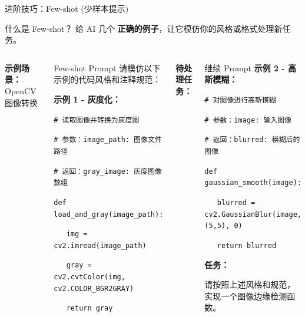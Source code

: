 \begin{frame}{进阶技巧：Few-shot (少样本提示)}
	\begin{block}{什么是 Few-shot？}
		给 AI 几个 \textbf{正确的例子}，让它模仿你的风格或格式处理新任务。
	\end{block}

	\vspace{0.3cm}

	\begin{columns}
		\textbf{示例场景：} OpenCV 图像转换

		\vspace{0.2cm}

		\begin{exampleblock}{Few-shot Prompt}
			请模仿以下示例的代码风格和注释规范：

			\vspace{0.2cm}

			\textbf{示例 1 - 灰度化：}

			\texttt{\# 读取图像并转换为灰度图}

			\texttt{\# 参数：image\_path: 图像文件路径}

			\texttt{\# 返回：gray\_image: 灰度图像数组}

			\texttt{def load\_and\_gray(image\_path):}

			\texttt{~~~img = cv2.imread(image\_path)}

			\texttt{~~~gray = cv2.cvtColor(img, cv2.COLOR\_BGR2GRAY)}

			\texttt{~~~return gray}
		\end{exampleblock}

		\textbf{待处理任务：}

		\vspace{0.2cm}

		\begin{exampleblock}{继续 Prompt}
			\textbf{示例 2 - 高斯模糊：}

			\texttt{\# 对图像进行高斯模糊}

			\texttt{\# 参数：image: 输入图像}

			\texttt{\# 返回：blurred: 模糊后的图像}

			\texttt{def gaussian\_smooth(image):}

			\texttt{~~~blurred = cv2.GaussianBlur(image, (5,5), 0)}

			\texttt{~~~return blurred}

			\vspace{0.3cm}

			\textbf{任务：}

			请按照上述风格和规范，实现一个图像边缘检测函数。
		\end{exampleblock}
	\end{columns}
\end{frame}

